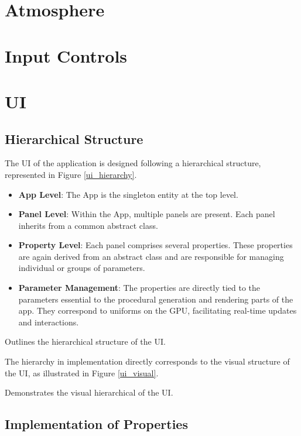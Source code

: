 \section{Atmosphere}

\section{Input Controls}

\section{UI}

\subsection{Hierarchical Structure}

The UI of the application is designed following a hierarchical structure, represented in Figure \ref{ui_hierarchy}.

\begin{itemize}
    \item \textbf{App Level}: The App is the singleton entity at the top level.
    \item \textbf{Panel Level}: Within the App, multiple panels are present. Each panel inherits from a common abstract class.
    \item \textbf{Property Level}: Each panel comprises several properties. These properties are again derived from an abstract class and are responsible for managing individual or groups of parameters.
    \item \textbf{Parameter Management}: The properties are directly tied to the parameters essential to the procedural generation and rendering parts of the app. They correspond to uniforms on the GPU, facilitating real-time updates and interactions.
\end{itemize}

{Outlines the hierarchical structure of the UI.}

The hierarchy in implementation directly corresponds to the visual structure of the UI, as illustrated in Figure \ref{ui_visual}.

{Demonstrates the visual hierarchical of the UI.}

\subsection{Implementation of Properties}

